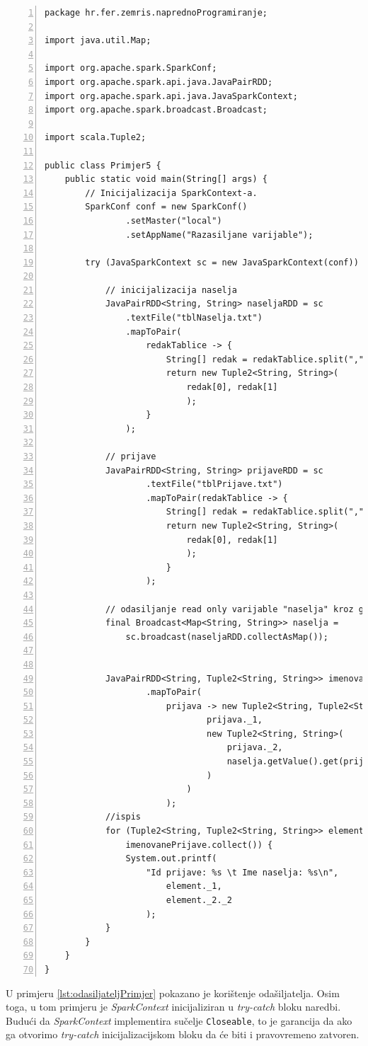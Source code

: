 \documentclass[times, utf8, zavrsni, numeric]{fer}
\begin{document}
\vspace{5mm}
\begin{lstlisting}[numbers=left, label={lst:odasiljateljPrimjer}, caption={Korištenje odašiljatelja.}, escapechar=|]
package hr.fer.zemris.naprednoProgramiranje;

import java.util.Map;

import org.apache.spark.SparkConf;
import org.apache.spark.api.java.JavaPairRDD;
import org.apache.spark.api.java.JavaSparkContext;
import org.apache.spark.broadcast.Broadcast;

import scala.Tuple2;

public class Primjer5 {
	public static void main(String[] args) {
		// Inicijalizacija SparkContext-a.
		SparkConf conf = new SparkConf()
				.setMaster("local")
				.setAppName("Razasiljane varijable");
				
		try (JavaSparkContext sc = new JavaSparkContext(conf)) {
		
			// inicijalizacija naselja
			JavaPairRDD<String, String> naseljaRDD = sc
				.textFile("tblNaselja.txt")
				.mapToPair(
					redakTablice -> {
						String[] redak = redakTablice.split(",");
						return new Tuple2<String, String>(
							redak[0], redak[1]
							);
					}
				);
					
			// prijave
			JavaPairRDD<String, String> prijaveRDD = sc
					.textFile("tblPrijave.txt")
					.mapToPair(redakTablice -> {
						String[] redak = redakTablice.split(",");
						return new Tuple2<String, String>(
							redak[0], redak[1]
							);
						}
					);
							
			// odasiljanje read only varijable "naselja" kroz grozd
			final Broadcast<Map<String, String>> naselja = 
				sc.broadcast(naseljaRDD.collectAsMap());

			
			JavaPairRDD<String, Tuple2<String, String>> imenovanePrijave = prijaveRDD
					.mapToPair(
						prijava -> new Tuple2<String, Tuple2<String, String>>(
								prijava._1,
								new Tuple2<String, String>(
									prijava._2,
									naselja.getValue().get(prijava._2)
								)
							)
						);
			//ispis
			for (Tuple2<String, Tuple2<String, String>> element :
			 	imenovanePrijave.collect()) {
				System.out.printf(
					"Id prijave: %s \t Ime naselja: %s\n",
						element._1,
						element._2._2
					);
			}
		}
	}
}
\end{lstlisting}
\vspace{5mm}

U primjeru \ref{lst:odasiljateljPrimjer} pokazano je korištenje odašiljatelja. Osim toga, u tom primjeru je \emph{SparkContext} inicijaliziran u \emph{try-catch} bloku naredbi. Budući da \emph{SparkContext} implementira sučelje \texttt{Closeable}, to je garancija da ako ga otvorimo \emph{try-catch} inicijalizacijskom bloku da će biti i pravovremeno zatvoren.
\end{document}
